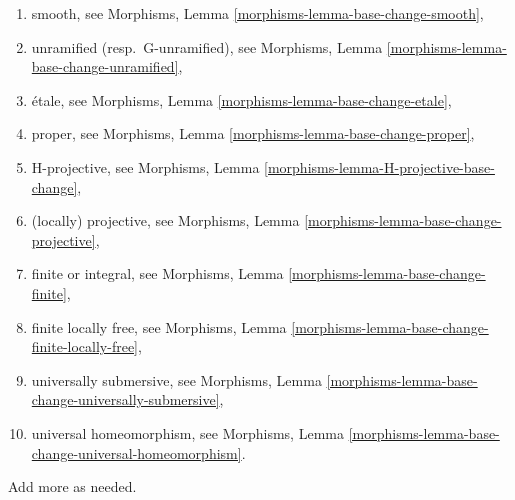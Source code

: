 \begin{remark}
\begin{enumerate}
\item smooth, see
Morphisms, Lemma \ref{morphisms-lemma-base-change-smooth},
\item unramified (resp.\ G-unramified), see
Morphisms, Lemma \ref{morphisms-lemma-base-change-unramified},
\item \'etale, see
Morphisms, Lemma \ref{morphisms-lemma-base-change-etale},
\item proper, see
Morphisms, Lemma \ref{morphisms-lemma-base-change-proper},
\item H-projective, see
Morphisms, Lemma \ref{morphisms-lemma-H-projective-base-change},
\item (locally) projective, see
Morphisms, Lemma \ref{morphisms-lemma-base-change-projective},
\item finite or integral, see
Morphisms, Lemma \ref{morphisms-lemma-base-change-finite},
\item finite locally free, see
Morphisms, Lemma \ref{morphisms-lemma-base-change-finite-locally-free},
\item universally submersive, see
Morphisms, Lemma \ref{morphisms-lemma-base-change-universally-submersive},
\item universal homeomorphism, see
Morphisms, Lemma \ref{morphisms-lemma-base-change-universal-homeomorphism}.
\end{enumerate}
Add more as needed.
\end{remark}

